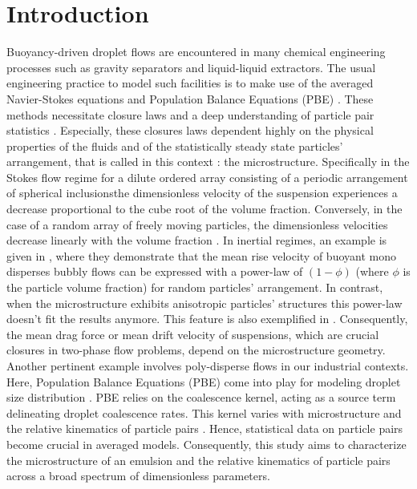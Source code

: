 \section{Introduction}

Buoyancy-driven droplet flows are encountered in many chemical engineering processes such as gravity separators and liquid-liquid extractors. 
The usual engineering practice to model such facilities is to make use of the averaged Navier-Stokes equations and Population Balance Equations (PBE) \citep{castellano2019}. %
These methods necessitate closure laws and a deep understanding of particle pair statistics \citep{simonin1996}.
Especially, these closures laws dependent highly on the physical properties of the fluids and of the statistically steady state particles' arrangement, that is called in this context : the microstructure. 
Specifically in the Stokes flow regime for a dilute ordered array consisting of a periodic arrangement of spherical inclusionsthe dimensionless velocity of the suspension experiences a decrease proportional to the cube root of the volume fraction. Conversely, in the case of a random array of freely moving particles, the dimensionless velocities decrease linearly with the volume fraction \citep{saffman1973}.
In inertial regimes, an example is given in \citet{yin2008lattice}, where they demonstrate that the mean rise velocity of buoyant mono disperses bubbly flows can be expressed with a power-law of $(1-\phi)$ (where $\phi$ is the particle volume fraction) for random particles' arrangement.
In contrast, when the microstructure exhibits anisotropic particles' structures this power-law doesn't fit the results anymore. This feature is also exemplified in \citet{loisy2017}.  
Consequently, the mean drag force or mean drift velocity of suspensions, which are crucial closures in two-phase flow problems, depend on the microstructure geometry.  
Another pertinent example involves poly-disperse flows in our industrial contexts. Here, Population Balance Equations (PBE) come into play for modeling droplet size distribution \citep{randolph2012theory}. PBE relies on the coalescence kernel, acting as a source term delineating droplet coalescence rates. This kernel varies with microstructure and the relative kinematics of particle pairs \citep{chesters1991modelling}.
Hence, statistical data on particle pairs become crucial in averaged models.
Consequently, this study aims to characterize the microstructure of an emulsion and the relative kinematics of particle pairs across a broad spectrum of dimensionless parameters. %


